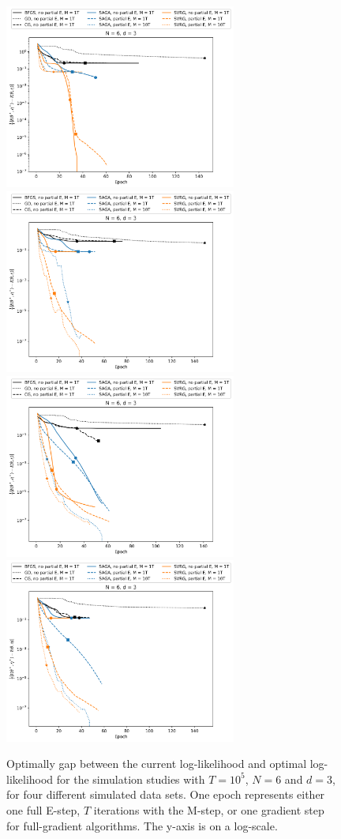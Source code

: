 \documentclass{article}
\begin{document}
%
\begin{figure}
    \centering
    \includegraphics[width=3in]{../plt/log-like_v_epoch_T-100000-K-6-1-d-3-001.png}
    \includegraphics[width=3in]{../plt/log-like_v_epoch_T-100000-K-6-1-d-3-002.png}
    \\
    \includegraphics[width=3in]{../plt/log-like_v_epoch_T-100000-K-6-1-d-3-003.png}
    \includegraphics[width=3in]{../plt/log-like_v_epoch_T-100000-K-6-1-d-3-004.png}   
    \caption{Optimally gap between the current log-likelihood and optimal log-likelihood for the simulation studies with $T=10^{5}$, $N=6$ and $d=3$, for four different simulated data sets. One epoch represents either one full E-step, $T$ iterations with the M-step, or one gradient step for full-gradient algorithms. The y-axis is on a log-scale.}
\end{figure}
\end{document}

